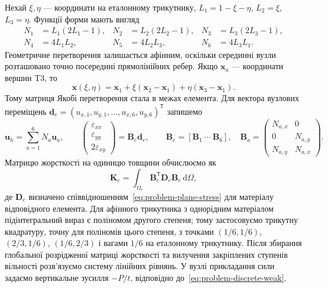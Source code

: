 Нехай $\xi,\eta$ --- координати на еталонному трикутнику, $L_1=1-\xi-\eta$, $L_2=\xi$, $L_3=\eta$. Функції форми мають вигляд
\begin{equation}
 \begin{aligned}
 N_1&=L_1(2L_1-1), & N_2&=L_2(2L_2-1),&
 N_3&=L_3(2L_3-1),\\
 N_4&=4L_1L_2,& N_5&=4L_2L_3,& N_6&=4L_3L_1.
 \end{aligned}
 \label{eq:t6-shapes}
\end{equation}
Геометричне перетворення залишається афінним, оскільки серединні вузли розташовано точно посередині прямолінійних ребер. Якщо $\boldsymbol x_a$ --- координати вершин T3, то
\begin{equation}
 \boldsymbol x(\xi,\eta)=
 \boldsymbol x_1+\xi(\boldsymbol x_2-\boldsymbol x_1)
 +\eta(\boldsymbol x_3-\boldsymbol x_1).
 \label{eq:t6-geometry}
\end{equation}
Тому матриця Якобі перетворення стала в межах елемента. Для вектора вузлових переміщень
$\boldsymbol d_e=(u_{x,1},u_{y,1},\ldots,u_{x,6},u_{y,6})^{\mathsf T}$
запишемо
\begin{equation}
 \boldsymbol u_h=\sum_{a=1}^{6}N_a\boldsymbol u_a,\qquad
 \begin{pmatrix}
 \varepsilon_{xx}\\\varepsilon_{yy}\\2\varepsilon_{xy}
 \end{pmatrix}
 =\boldsymbol B_e\boldsymbol d_e,\qquad
 \boldsymbol B_e=[\boldsymbol B_1\ \cdots\ \boldsymbol B_6],
 \quad
 \boldsymbol B_a=
 \begin{pmatrix}
 N_{a,x}&0\\0&N_{a,y}\\N_{a,y}&N_{a,x}
 \end{pmatrix}.
 \label{eq:t6-B}
\end{equation}
Матрицю жорсткості на одиницю товщини обчислюємо як
\begin{equation}
 \boldsymbol K_e=
 \int_{\Omega_e}\boldsymbol B_e^{\mathsf T}
 \boldsymbol D_e\boldsymbol B_e\,\mathrm d\Omega,
 \label{eq:t6-stiffness}
\end{equation}
де $\boldsymbol D_e$ визначено співвідношенням~\eqref{eq:problem-plane-stress} для матеріалу відповідного елемента. Для афінного трикутника з однорідним матеріалом підінтегральний вираз є поліномом другого степеня; тому застосовуємо трикутну квадратуру, точну для поліномів цього степеня, з точками $(1/6,1/6)$, $(2/3,1/6)$, $(1/6,2/3)$ і вагами $1/6$ на еталонному трикутнику. Після збирання глобальної розрідженої матриці жорсткості та вилучення закріплених ступенів вільності розв'язуємо систему лінійних рівнянь. У вузлі прикладання сили задаємо вертикальне зусилля $-P/t$, відповідно до~\eqref{eq:problem-discrete-weak}.


